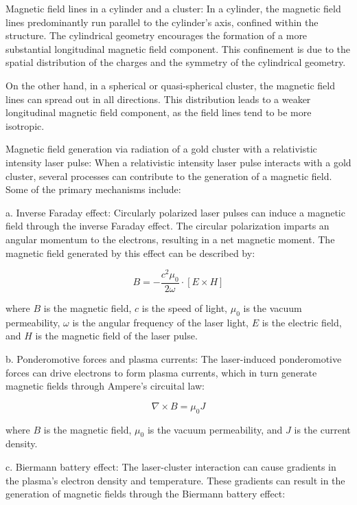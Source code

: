 Magnetic field lines in a cylinder and a cluster:
In a cylinder, the magnetic field lines predominantly run parallel to the cylinder's axis, confined within the structure. The cylindrical geometry encourages the formation of a more substantial longitudinal magnetic field component. This confinement is due to the spatial distribution of the charges and the symmetry of the cylindrical geometry.

On the other hand, in a spherical or quasi-spherical cluster, the magnetic field lines can spread out in all directions. This distribution leads to a weaker longitudinal magnetic field component, as the field lines tend to be more isotropic.

Magnetic field generation via radiation of a gold cluster with a relativistic intensity laser pulse:
When a relativistic intensity laser pulse interacts with a gold cluster, several processes can contribute to the generation of a magnetic field. Some of the primary mechanisms include:


a. Inverse Faraday effect: Circularly polarized laser pulses can induce a magnetic field through the inverse Faraday effect. The circular polarization imparts an angular momentum to the electrons, resulting in a net magnetic moment. The magnetic field generated by this effect can be described by:

\begin{equation}
    B = - \frac{c^2 \mu_0}{2 \omega} \cdot \left[ E \times H \right]
\end{equation}

where $B$ is the magnetic field, $c$ is the speed of light, $\mu_0$ is the vacuum permeability, $\omega$ is the angular frequency of the laser light, $E$ is the electric field, and $H$ is the magnetic field of the laser pulse.

b. Ponderomotive forces and plasma currents: The laser-induced ponderomotive forces can drive electrons to form plasma currents, which in turn generate magnetic fields through Ampere's circuital law:

\begin{equation}
    \nabla \times B = \mu_0 J
\end{equation}

where $B$ is the magnetic field, $\mu_0$ is the vacuum permeability, and $J$ is the current density.

c. Biermann battery effect: The laser-cluster interaction can cause gradients in the plasma's electron density and temperature. These gradients can result in the generation of magnetic fields through the Biermann battery effect:

